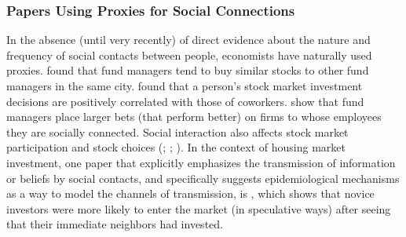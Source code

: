 
\subsubsection{Papers Using Proxies for Social Connections}

In the absence (until very recently) of direct evidence about the nature and frequency of social contacts between people, economists have naturally used proxies.    \href{http://www.columbia.edu/~hh2679/ThyNeighborJF.pdf}{\cite{hong2005thy}} found that fund managers tend to buy similar stocks to other fund managers in the same city. \href{https://github.com/iworld1991/EpiExp/blob/master/Literature/hvide2015social.pdf}{\cite{hvide2015social}} found that a person's stock market investment decisions are positively correlated with those of coworkers.  \href{https://www.jstor.org/stable/10.1086/592415}{\cite{cohen2008small}} show that fund managers place larger bets (that perform better) on firms to whose employees they are socially connected.  Social interaction also affects stock market participation and stock choices (\href{https://github.com/iworld1991/EpiExp/blob/master/Literature/hong2004social.pdf}{\cite{hong2004social}}; \href{https://onlinelibrary.wiley.com/doi/abs/10.1111/j.1540-6261.2008.01364.x}{\cite{brown2008neighbors}};  \href{https://github.com/iworld1991/EpiExp/blob/master/Literature/ivkovic2007information.pdf}{\cite{ivkovic2007information}}). %
In the context of housing market investment, one paper that explicitly emphasizes the transmission of information or beliefs by social contacts, and specifically suggests epidemiological mechanisms as a way to model the channels of transmission, is
\href{https://www.aeaweb.org/articles?id=10.1257/aer.20171611&from=f}{\cite{bayer2021speculative}}, which shows that novice investors were more likely to enter the market (in speculative ways) after seeing that their immediate neighbors had invested.


